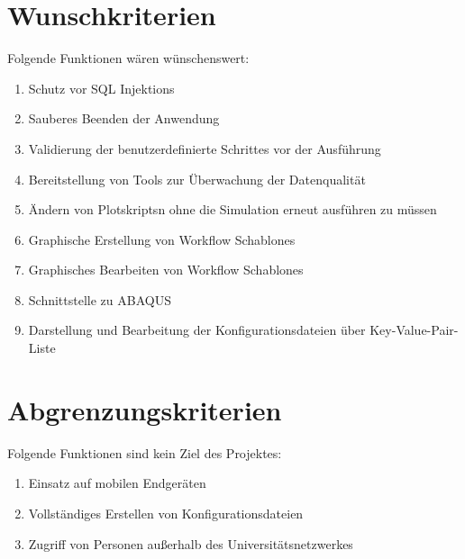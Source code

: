 \section{Wunschkriterien}
Folgende Funktionen wären wünschenswert:
\renewcommand{\labelenumi}{/W\arabic{enumi}0/}
\begin{enumerate}
    \setlength\itemsep{-1em}
    \item Schutz vor \gls{SQL} \glspl{Injektion}
    \item Sauberes Beenden der Anwendung
    \item Validierung der \glspl{benutzerdefinierte Schritte} vor der Ausführung
    \item Bereitstellung von Tools zur Überwachung der Datenqualität
    \item Ändern von \glspl{Plotskript}n ohne die Simulation erneut ausführen zu müssen
    \item Graphische Erstellung von \glspl{Workflow Schablone}
    \item Graphisches Bearbeiten von \glspl{Workflow Schablone}
    \item Schnittstelle zu \gls{ABAQUS}
    \item Darstellung und Bearbeitung der Konfigurationsdateien über \gls{Key-Value-Pair}-Liste
\end{enumerate}

\section{Abgrenzungskriterien}
Folgende Funktionen sind kein Ziel des Projektes:
\renewcommand{\labelenumi}{/A\arabic{enumi}0/}
\begin{enumerate}
    \setlength\itemsep{-1em}
    \item Einsatz auf mobilen Endgeräten
    \item Vollständiges Erstellen von Konfigurationsdateien
    \item Zugriff von Personen außerhalb des Universitätsnetzwerkes 
\end{enumerate}
\renewcommand{\labelenumi}{\arabic{enumi}}